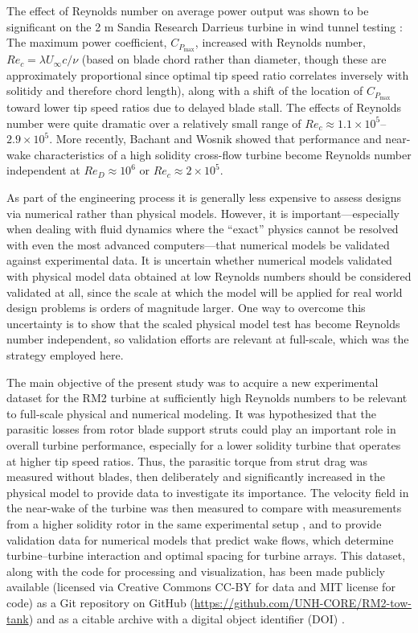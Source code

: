 The effect of Reynolds number on average power output was shown to be
significant on the 2 m Sandia Research Darrieus turbine in wind tunnel testing
\cite{Blackwell1976}: The maximum power coefficient, $C_{P_{\max}}$, increased
with Reynolds number, $Re_c=\lambda U_\infty c / \nu$ (based on blade chord
rather than diameter, though these are approximately proportional since optimal
tip speed ratio correlates inversely with solitidy and therefore chord length),
along with a shift of the location of $C_{P_{\max}}$ toward lower tip speed
ratios due to delayed blade stall. The effects of Reynolds number were quite
dramatic over a relatively small range of $Re_c \approx 1.1 \times 10^5$--$2.9
\times 10^5$. More recently, Bachant and Wosnik \cite{Bachant2014,
    Bachant2016-RVAT-Re-dep} showed that performance and near-wake characteristics
of a high solidity cross-flow turbine become Reynolds number independent at
$Re_D \approx 10^6$ or $Re_c \approx 2 \times 10^5$.

As part of the engineering process it is generally less expensive to assess
designs via numerical rather than physical models. However, it is
important---especially when dealing with fluid dynamics where the ``exact''
physics cannot be resolved with even the most advanced computers---that
numerical models be validated against experimental data. It is uncertain whether
numerical models validated with physical model data obtained at low Reynolds
numbers should be considered validated at all, since the scale at which the
model will be applied for real world design problems is orders of magnitude
larger. One way to overcome this uncertainty is to show that the scaled physical
model test has become Reynolds number independent, so validation efforts are
relevant at full-scale, which was the strategy employed here.

The main objective of the present study was to acquire a new experimental
dataset for the RM2 turbine at sufficiently high Reynolds numbers to be relevant
to full-scale physical and numerical modeling. It was hypothesized that the
parasitic losses from rotor blade support struts could play an important role in
overall turbine performance, especially for a lower solidity turbine that
operates at higher tip speed ratios. Thus, the parasitic torque from strut drag
was measured without blades, then deliberately and significantly increased in
the physical model to provide data to investigate its importance. The velocity
field in the near-wake of the turbine was then measured to compare with
measurements from a higher solidity rotor in the same experimental setup
\cite{Bachant2015-JoT}, and to provide validation data for numerical models that
predict wake flows, which determine turbine--turbine interaction and optimal
spacing for turbine arrays. This dataset, along with the code for processing and
visualization, has been made publicly available (licensed via Creative Commons
CC-BY for data and MIT license for code) as a Git repository on GitHub
(\url{https://github.com/UNH-CORE/RM2-tow-tank}) and as a citable archive with a
digital object identifier (DOI) \cite{Bachant2016-RM2-data}.


